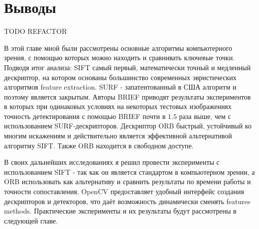 \section{Выводы}

TODO REFACTOR

В этой главе мной были рассмотрены основные алгоритмы компьютерного зрения, с помощью которых можно находить и сравнивать ключевые точки. Подводя итог анализа: SIFT самый первый, математически точный и медленный дескриптор, на котором основаны большинство современных эвристических алгоритмов feature extraction. SURF - запатентованный в США алгоритм и поэтому является закрытым. Авторы BRIEF приводят результаты экспериментов в которых при одинаковых условиях на некоторых тестовых изображениях точность детектирования с помощью BRIEF почти в $1.5$ раза выше, чем с использованием SURF-дескрипторов. Дескриптор ORB быстрый, устойчивый ко многим искажениям и действительно является эффективной альтернативой алгоритму SIFT. Также ORB находится в свободном доступе.

В своих дальнейших исследованиях я решил провести эксперименты с использованием SIFT - так как он является стандартом в компьютерном зрении, а ORB использовать как альтернативу и сравнить результаты по времени работы и точности сопоставления. OpenCV предоставляет удобный интерфейс создания дескрипторов и детекторов, что даёт возможность динамически сменять features methods. Практические эксперименты и их результаты будут рассмотрены в следующей главе.
